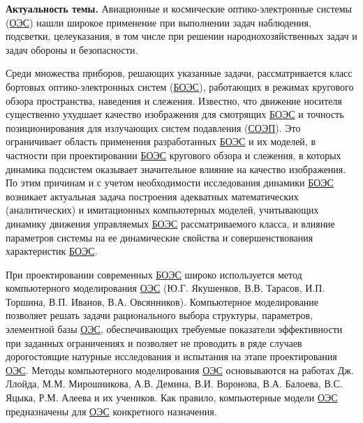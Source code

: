 
{\actuality} \textbf{Актуальность темы.} Авиационные и космические оптико-электронные системы (\hyperref[acroEOS]{ОЭС}) нашли широкое применение при выполнении задач наблюдения, подсветки, целеуказания, в том числе при решении народнохозяйственных задач и задач обороны и безопасности. 



Среди множества приборов, решающих указанные задачи, рассматривается класс бортовых оптико-электронных систем (\hyperref[acroAEOS]{БОЭС}), работающих в режимах кругового обзора пространства, наведения и слежения. Известно, что движение носителя существенно ухудшает качество изображения для смотрящих \hyperref[acroAEOS]{БОЭС} и точность позиционирования для излучающих систем подавления (\hyperref[acroSOEP]{СОЭП}). Это ограничивает область применения разработанных \hyperref[acroAEOS]{БОЭС} и их моделей, в частности при проектировании \hyperref[acroAEOS]{БОЭС} кругового обзора и слежения, в которых динамика подсистем оказывает значительное влияние на качество изображения. По этим причинам и с учетом необходимости исследования динамики \hyperref[acroAEOS]{БОЭС} возникает актуальная задача построения адекватных математических (аналитических) и имитационных компьютерных моделей, учитывающих динамику движения управляемых \hyperref[acroAEOS]{БОЭС} рассматриваемого класса, и влияние параметров системы на ее динамические свойства и совершенствования характеристик \hyperref[acroAEOS]{БОЭС}.

При проектировании современных \hyperref[acroAEOS]{БОЭС} широко используется метод компьютерного моделирования  \hyperref[acroEOS]{ОЭС} (Ю.Г. Якушенков, В.В. Тарасов, И.П. Торшина, В.П. Иванов, В.А. Овсянников). Компьютерное моделирование позволяет решать задачи рационального выбора структуры, параметров, элементной базы  \hyperref[acroEOS]{ОЭС}, обеспечивающих требуемые показатели эффективности при заданных ограничениях и позволяет не проводить в ряде случаев дорогостоящие натурные исследования и испытания на этапе проектирования  \hyperref[acroEOS]{ОЭС}. Методы компьютерного моделирования  \hyperref[acroEOS]{ОЭС} основываются на работах Дж. Ллойда, М.М. Мирошникова, А.В. Демина, В.И. Воронова, В.А. Балоева, В.С. Яцыка, Р.М.  Алеева и их учеников. Как правило, компьютерные модели  \hyperref[acroEOS]{ОЭС} предназначены для  \hyperref[acroEOS]{ОЭС} конкретного назначения. 

